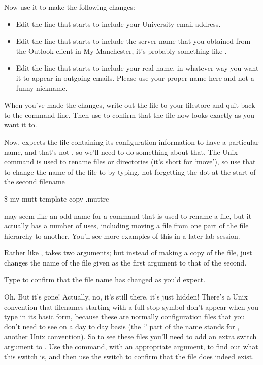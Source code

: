 Now use it to make the following changes:

\begin{itemize}
\item Edit the line that starts  to include your University email address.
\item Edit the line that starts  to include the server name that you obtained from the Outlook client in My Manchester, it's probably something like .
\item Edit the line that starts  to include your real name, in whatever way you want it to appear in outgoing emails. Please use your proper name here and not a funny nickname.
\end{itemize}

When you've made the changes, write out the file to your filestore and quit back to the command line. Then use  to confirm that the file now looks exactly as you want it to.

Now,  expects the file containing its configuration information to have a particular name, and that's not , so we'll need to do something about that. The Unix  command is used to rename files or directories (it's short for `move'), so use that to change the name of the file to  by typing, not forgetting the dot at the start of the second filename


\begin{ttoutenv}
\$ mv mutt-template-copy .muttrc
\end{ttoutenv}


 may seem like an odd name for a command that is used to rename a file, but it actually has a number of uses, including moving a file from one part of the file hierarchy to another. You'll see more examples of this in a later lab session.

Rather like ,  takes two arguments; but instead of making a copy of the file,  just changes the name of the file given as the first argument to that of the second.

Type  to confirm that the file name has changed as you'd expect.

Oh. But it's gone! Actually, no, it's still there, it's just hidden! There's a Unix convention that filenames  starting with a full-stop symbol don't appear when you type  in its basic form, because these are normally configuration files that you don't need to see on a day to day basis (the `' part of the  name stands for , another Unix convention). So to see these files you'll need to add an extra switch argument to . Use the  command, with an appropriate argument, to find out what this switch is, and then use the switch to confirm that the  file does indeed exist.

